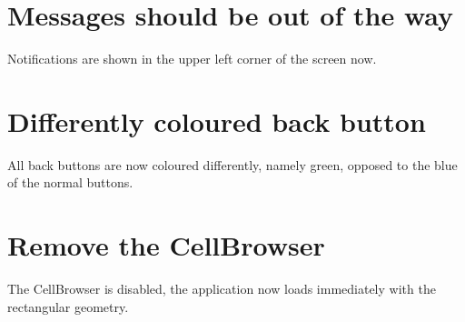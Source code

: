 \section*{Messages should be out of the way}
Notifications are shown in the upper left corner of the screen now.

\section*{Differently coloured back button}
All back buttons are now coloured differently, namely green, opposed to the blue of the normal buttons.

\section*{Remove the CellBrowser}
The CellBrowser is disabled, the application now loads immediately with the rectangular geometry.
